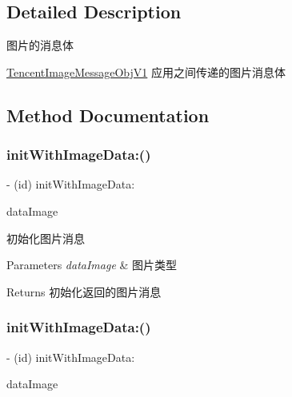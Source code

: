 \subsection{Detailed Description}
图片的消息体 

\mbox{\hyperlink{interface_tencent_image_message_obj_v1}{Tencent\+Image\+Message\+Obj\+V1}} 应用之间传递的图片消息体 

\subsection{Method Documentation}
\mbox{\label{interface_tencent_image_message_obj_v1_a363d7796b5bda745e71b8be57c94ec38}} 
\subsubsection{\texorpdfstring{init\+With\+Image\+Data\+:()}{initWithImageData:()}\hspace{0.1cm}{\footnotesize\ttfamily [1/2]}}
{\footnotesize\ttfamily -\/ (id) init\+With\+Image\+Data\+: \begin{DoxyParamCaption}\item[{(N\+S\+Data $\ast$)}]{data\+Image }\end{DoxyParamCaption}}

初始化图片消息 
\begin{DoxyParams}{Parameters}
{\em data\+Image} & 图片类型 \\
\hline
\end{DoxyParams}
\begin{DoxyReturn}{Returns}
初始化返回的图片消息 
\end{DoxyReturn}
\mbox{\label{interface_tencent_image_message_obj_v1_a363d7796b5bda745e71b8be57c94ec38}} 
\subsubsection{\texorpdfstring{init\+With\+Image\+Data\+:()}{initWithImageData:()}\hspace{0.1cm}{\footnotesize\ttfamily [2/2]}}
{\footnotesize\ttfamily -\/ (id) init\+With\+Image\+Data\+: \begin{DoxyParamCaption}\item[{(N\+S\+Data $\ast$)}]{data\+Image }\end{DoxyParamCaption}}

